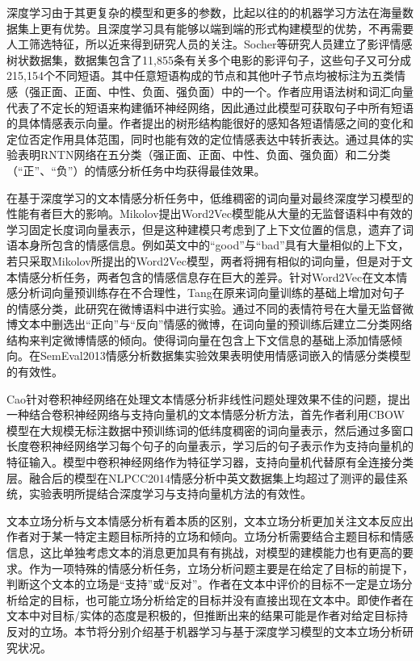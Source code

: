 
深度学习由于其更复杂的模型和更多的参数，比起以往的的机器学习方法在海量数据集上更有优势。且深度学习具有能够以端到端的形式构建模型的优势，不再需要人工筛选特征，所以近来得到研究人员的关注。Socher等研究人员建立了影评情感树状数据集，数据集包含了11,855条有关多个电影的影评句子，这些句子又可分成215,154个不同短语。其中任意短语构成的节点和其他叶子节点均被标注为五类情感（强正面、正面、中性、负面、强负面）中的一个。作者应用语法树和词汇向量代表了不定长的短语来构建循环神经网络，因此通过此模型可获取句子中所有短语的具体情感表示向量。作者提出的树形结构能很好的感知各短语情感之间的变化和定位否定作用具体范围，同时也能有效的定位情感表达中转折表达。通过具体的实验表明RNTN网络在五分类（强正面、正面、中性、负面、强负面）和二分类（“正”、“负”）的情感分析任务中均获得最佳效果。

在基于深度学习的文本情感分析任务中，低维稠密的词向量对最终深度学习模型的性能有者巨大的影响。Mikolov提出Word2Vec模型能从大量的无监督语料中有效的学习固定长度词向量表示，但是这种建模只考虑到了上下文位置的信息，遗弃了词语本身所包含的情感信息。例如英文中的“good”与“bad”具有大量相似的上下文，若只采取Mikolov所提出的Word2Vec模型，两者将拥有相似的词向量，但是对于文本情感分析任务，两者包含的情感信息存在巨大的差异。针对Word2Vec在文本情感分析词向量预训练存在不合理性，Tang在原来词向量训练的基础上增加对句子的情感分类，此研究在微博语料中进行实验。通过不同的表情符号在大量无监督微博文本中删选出“正向”与“反向”情感的微博，在词向量的预训练后建立二分类网络结构来判定微博情感的倾向。使得词向量在包含上下文信息的基础上添加情感倾向。在SemEval2013情感分析数据集实验效果表明使用情感词嵌入的情感分类模型的有效性。

Cao针对卷积神经网络在处理文本情感分析非线性问题处理效果不佳的问题，提出一种结合卷积神经网络与支持向量机的文本情感分析方法，首先作者利用CBOW模型在大规模无标注数据中预训练词的低纬度稠密的词向量表示，然后通过多窗口长度卷积神经网络学习每个句子的向量表示，学习后的句子表示作为支持向量机的特征输入。模型中卷积神经网络作为特征学习器，支持向量机代替原有全连接分类层。融合后的模型在NLPCC2014情感分析中英文数据集上均超过了测评的最佳系统，实验表明所提结合深度学习与支持向量机方法的有效性。


文本立场分析与文本情感分析有着本质的区别，文本立场分析更加关注文本反应出作者对于某一特定主题目标所持的立场和倾向。立场分析需要结合主题目标和情感信息，这比单独考虑文本的消息更加具有有挑战，对模型的建模能力也有更高的要求。作为一项特殊的情感分析任务，立场分析问题主要是在给定了目标的前提下，判断这个文本的立场是“支持”或“反对”。作者在文本中评价的目标不一定是立场分析给定的目标，也可能立场分析给定的目标并没有直接出现在文本中。即使作者在文本中对目标/实体的态度是积极的，但推断出来的结果可能是作者对给定目标持反对的立场。本节将分别介绍基于机器学习与基于深度学习模型的文本立场分析研究状况。


